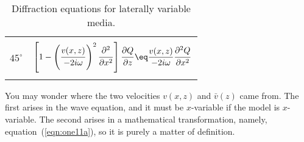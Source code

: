 {\begin{table}
\begin{center}
\begin{tabular}{|r|l|}
     &        \\
$45^\circ$ & $\left[ 1 - \left( \displaystyle 
             {\strut v(x, z)\over - 2i\omega}\right) ^2
\displaystyle {\strut\partial^2\over\partial x^2 } 
              \right]
\displaystyle {\strut\partial Q\over\partial z}\eq
\displaystyle {v(x, z)\over - 2i\omega} 
 {\strut\partial^2 Q\over\partial x^2}$    \\
     &        \\       \hline
\end{tabular}
\end{center}
\label{eqn:1-5}
\caption{Diffraction equations for laterally variable media.}
\end{table}
You may wonder where the two velocities $v(x,z)$ and $\bar v (z)$ came from.
The first arises in the wave equation,
and it must be $x$-variable if the model is $x$-variable.
The second arises in a mathematical transformation,
namely, equation~(\ref{eqn:one11a}),
so it is purely a matter of definition.
}
